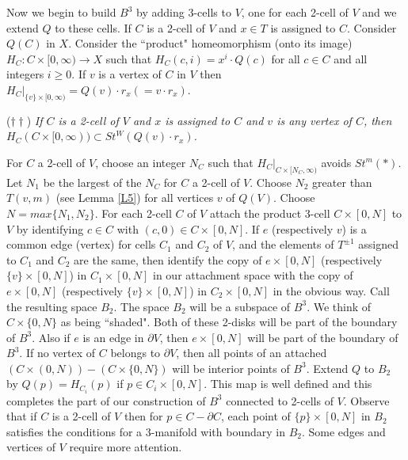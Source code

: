 \documentclass[12pt]{article}
\numberwithin{equation}{section}
\begin{document}
Now we begin to build $B^3$ by adding 3-cells to $V$, one for each 2-cell of $V$ and we extend $Q$ to these cells. If $C$ is a 2-cell of $V$ and $x\in T$ is assigned to $C$. Consider $Q(C)$ in $X$. Consider  the ``product" homeomorphism (onto its image) $H_C:C\times [0,\infty)\to X$ such that $H_C(c,i)=x^i\cdot Q(c)$ for all $c\in C$ and all integers $i\geq 0$. If $v$ is a vertex of $C$ in $V$ %
then $H_C|_{\{v\}\times [0,\infty)}=Q(v)\cdot r_x(=v\cdot r_x)$. 

\medskip

\noindent ($\dagger\dagger$) {\it If $C$ is a 2-cell of $V$ and $x$ is assigned to $C$ and $v$ is any vertex of $C$, then $H_C(C\times [0,\infty))\subset St^{W}(Q(v)\cdot r_x)$.} 

\medskip

For $C$ a 2-cell of $V$, choose an integer $N_C$ such that $H_C|_{C\times [N_C,\infty)}$ avoids $St^m(\ast)$. Let $N_1$ be the largest of the $N_C$ for $C$ a 2-cell of $V$. Choose $N_2$ greater than $T(v,m)$ (see Lemma \ref{L5}) for all vertices $v$ of $Q(V)$. Choose $N=max\{N_1, N_2\}$. For each 2-cell $C$ of $V$ attach the product 3-cell $C\times [0,N]$ to $V$ by identifying $c\in C$ with $(c,0)\in C\times [0,N]$. If $e$ (respectively $v$) is a common edge (vertex) for cells $C_1$ and $C_2$ of $V$, and the elements of $T^{\pm 1}$ assigned to $C_1$ and $C_2$ are the same, then identify the copy of $e\times [0,N]$ (respectively $\{v\}\times [0,N]$) in $C_1\times [0,N]$  in our attachment space with the copy of $e\times [0,N]$ (respectively $\{v\}\times [0,N]$) in $C_2\times [0,N]$ in the obvious way. Call the resulting space $B_2$. The space $B_2$ will be a subspace of $B^3$. We think of $C\times \{0,N\}$ as being ``shaded". Both of these 2-disks will be part of the boundary of $B^3$. Also if $e$ is an edge in $\partial V$, then $e\times [0,N]$ will be part of the boundary of $B^3$.  If no vertex of $C$ belongs to $\partial V$, then all points of an attached $(C\times (0,N))-(C\times \{0,N\})$ will be interior points of $B^3$.  Extend $Q$ to $B_2$ by $Q(p)=H_{C_i}(p)$ if $p\in C_i\times [0,N]$. This map is well defined and this completes the part of our construction of $B^3$ connected to 2-cells of $V$. Observe that if $C$ is a 2-cell of $V$ then for $p\in C-\partial C$, each point of $\{p\}\times [0,N]$ in $B_2$ satisfies the conditions for a 3-manifold with boundary in $B_2$. Some edges and vertices of $V$ require more attention.  
\end{document}
